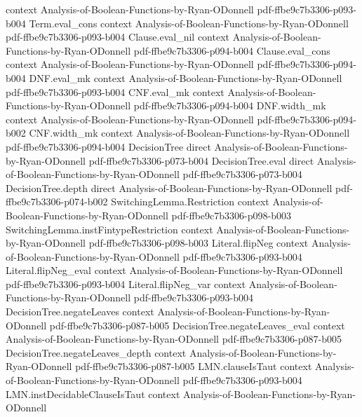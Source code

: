 \begin{lemma}
  {context}
  {Analysis-of-Boolean-Functions-by-Ryan-ODonnell}
  {pdf-ffbe9c7b3306-p093-b004}
\proofstep
  {Term.eval_cons}
  {context}
  {Analysis-of-Boolean-Functions-by-Ryan-ODonnell}
  {pdf-ffbe9c7b3306-p093-b004}
\proofstep
  {Clause.eval_nil}
  {context}
  {Analysis-of-Boolean-Functions-by-Ryan-ODonnell}
  {pdf-ffbe9c7b3306-p094-b004}
\proofstep
  {Clause.eval_cons}
  {context}
  {Analysis-of-Boolean-Functions-by-Ryan-ODonnell}
  {pdf-ffbe9c7b3306-p094-b004}
\proofstep
  {DNF.eval_mk}
  {context}
  {Analysis-of-Boolean-Functions-by-Ryan-ODonnell}
  {pdf-ffbe9c7b3306-p093-b004}
\proofstep
  {CNF.eval_mk}
  {context}
  {Analysis-of-Boolean-Functions-by-Ryan-ODonnell}
  {pdf-ffbe9c7b3306-p094-b004}
\proofstep
  {DNF.width_mk}
  {context}
  {Analysis-of-Boolean-Functions-by-Ryan-ODonnell}
  {pdf-ffbe9c7b3306-p094-b002}
\proofstep
  {CNF.width_mk}
  {context}
  {Analysis-of-Boolean-Functions-by-Ryan-ODonnell}
  {pdf-ffbe9c7b3306-p094-b004}
\proofstep
  {DecisionTree}
  {direct}
  {Analysis-of-Boolean-Functions-by-Ryan-ODonnell}
  {pdf-ffbe9c7b3306-p073-b004}
\proofstep
  {DecisionTree.eval}
  {direct}
  {Analysis-of-Boolean-Functions-by-Ryan-ODonnell}
  {pdf-ffbe9c7b3306-p073-b004}
\proofstep
  {DecisionTree.depth}
  {direct}
  {Analysis-of-Boolean-Functions-by-Ryan-ODonnell}
  {pdf-ffbe9c7b3306-p074-b002}
\proofstep
  {SwitchingLemma.Restriction}
  {context}
  {Analysis-of-Boolean-Functions-by-Ryan-ODonnell}
  {pdf-ffbe9c7b3306-p098-b003}
\proofstep
  {SwitchingLemma.instFintypeRestriction}
  {context}
  {Analysis-of-Boolean-Functions-by-Ryan-ODonnell}
  {pdf-ffbe9c7b3306-p098-b003}
\proofstep
  {Literal.flipNeg}
  {context}
  {Analysis-of-Boolean-Functions-by-Ryan-ODonnell}
  {pdf-ffbe9c7b3306-p093-b004}
\proofstep
  {Literal.flipNeg_eval}
  {context}
  {Analysis-of-Boolean-Functions-by-Ryan-ODonnell}
  {pdf-ffbe9c7b3306-p093-b004}
\proofstep
  {Literal.flipNeg_var}
  {context}
  {Analysis-of-Boolean-Functions-by-Ryan-ODonnell}
  {pdf-ffbe9c7b3306-p093-b004}
\proofstep
  {DecisionTree.negateLeaves}
  {context}
  {Analysis-of-Boolean-Functions-by-Ryan-ODonnell}
  {pdf-ffbe9c7b3306-p087-b005}
\proofstep
  {DecisionTree.negateLeaves_eval}
  {context}
  {Analysis-of-Boolean-Functions-by-Ryan-ODonnell}
  {pdf-ffbe9c7b3306-p087-b005}
\proofstep
  {DecisionTree.negateLeaves_depth}
  {context}
  {Analysis-of-Boolean-Functions-by-Ryan-ODonnell}
  {pdf-ffbe9c7b3306-p087-b005}
\proofstep
  {LMN.clauseIsTaut}
  {context}
  {Analysis-of-Boolean-Functions-by-Ryan-ODonnell}
  {pdf-ffbe9c7b3306-p093-b004}
\proofstep
  {LMN.instDecidableClauseIsTaut}
  {context}
  {Analysis-of-Boolean-Functions-by-Ryan-ODonnell}

\end{lemma}

